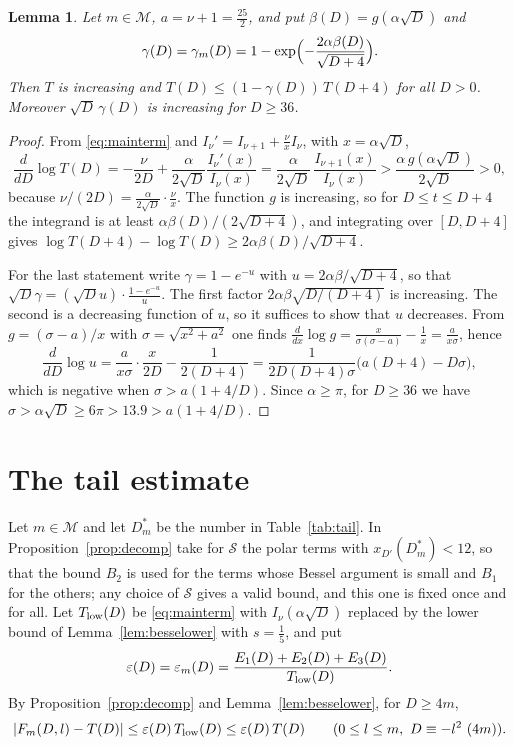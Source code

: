 \documentclass[11pt]{amsart}
\newtheorem{lemma}[theorem]{Lemma}
\theoremstyle{definition}
\newcommand{\Mset}{\mathcal{M}}
\begin{document}
\begin{lemma}\label{lem:gap}
Let $m\in\Mset$, $a=\nu+1=\frac{25}2$, and put $\beta(D)=g(\alpha\sqrt D)$ and
\[
\gamma(D)=\gamma_m(D)=1-\exp\Bigl(-\frac{2\alpha\beta(D)}{\sqrt{D+4}}\Bigr).
\]
Then $T$ is increasing and $T(D)\le(1-\gamma(D))\,T(D+4)$ for all $D>0$. Moreover $\sqrt D\,\gamma(D)$ is increasing for $D\ge36$.
\end{lemma}

\begin{proof}
From \eqref{eq:mainterm} and $I_\nu'=I_{\nu+1}+\frac\nu xI_\nu$, with $x=\alpha\sqrt D$,
\[
\frac{d}{dD}\log T(D)=-\frac{\nu}{2D}+\frac{\alpha}{2\sqrt D}\frac{I_\nu'(x)}{I_\nu(x)}=\frac{\alpha}{2\sqrt D}\,\frac{I_{\nu+1}(x)}{I_\nu(x)}>\frac{\alpha\,g(\alpha\sqrt D)}{2\sqrt D}>0,
\]
because $\nu/(2D)=\frac{\alpha}{2\sqrt D}\cdot\frac\nu x$. The function $g$ is increasing, so for $D\le t\le D+4$ the integrand is at least $\alpha\beta(D)/(2\sqrt{D+4})$, and integrating over $[D,D+4]$ gives $\log T(D+4)-\log T(D)\ge2\alpha\beta(D)/\sqrt{D+4}$.

For the last statement write $\gamma=1-e^{-u}$ with $u=2\alpha\beta/\sqrt{D+4}$, so that $\sqrt D\gamma=(\sqrt Du)\cdot\frac{1-e^{-u}}{u}$. The first factor $2\alpha\beta\sqrt{D/(D+4)}$ is increasing. The second is a decreasing function of $u$, so it suffices to show that $u$ decreases. From $g=(\sigma-a)/x$ with $\sigma=\sqrt{x^2+a^2}$ one finds $\frac{d}{dx}\log g=\frac{x}{\sigma(\sigma-a)}-\frac1x=\frac{a}{x\sigma}$, hence
\[
\frac{d}{dD}\log u=\frac{a}{x\sigma}\cdot\frac{x}{2D}-\frac{1}{2(D+4)}=\frac{1}{2D(D+4)\sigma}\bigl(a(D+4)-D\sigma\bigr),
\]
which is negative when $\sigma>a(1+4/D)$. Since $\alpha\ge\pi$, for $D\ge36$ we have $\sigma>\alpha\sqrt D\ge6\pi>13.9>a(1+4/D)$.
\end{proof}

\section{The tail estimate}\label{sec:tail}

Let $m\in\Mset$ and let $D^*_m$ be the number in Table~\ref{tab:tail}. In Proposition~\ref{prop:decomp} take for $\mathcal S$ the polar terms with $x_{D'}(D^*_m)<12$, so that the bound $B_2$ is used for the terms whose Bessel argument is small and $B_1$ for the others; any choice of $\mathcal S$ gives a valid bound, and this one is fixed once and for all. Let $T_{\rm low}(D)$ be \eqref{eq:mainterm} with $I_\nu(\alpha\sqrt D)$ replaced by the lower bound of Lemma~\ref{lem:besselower} with $s=\frac15$, and put
\[
\varepsilon(D)=\varepsilon_m(D)=\frac{E_1(D)+E_2(D)+E_3(D)}{T_{\rm low}(D)} .
\]
By Proposition~\ref{prop:decomp} and Lemma~\ref{lem:besselower}, for $D\ge4m$,
\begin{equation}\label{eq:FT}
|F_m(D,l)-T(D)|\le\varepsilon(D)\,T_{\rm low}(D)\le\varepsilon(D)\,T(D)\qquad(0\le l\le m,\ D\equiv-l^2\ (4m)).
\end{equation}
\end{document}
